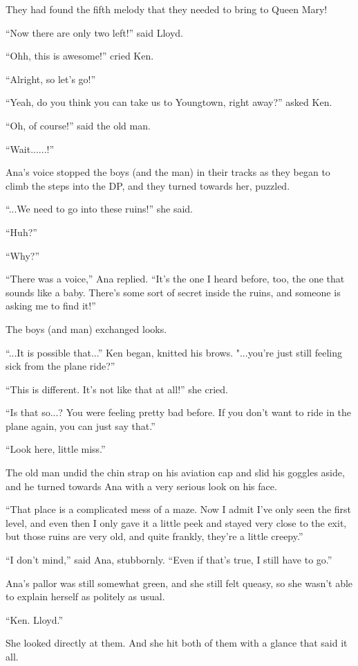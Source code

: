 \documentclass[
]{article}
\begin{document}
They had found the fifth melody that they needed to bring to Queen Mary!

``Now there are only two left!'' said Lloyd.

``Ohh, this is awesome!'' cried Ken.

``Alright, so let's go!''

``Yeah, do you think you can take us to Youngtown, right away?'' asked
Ken.

``Oh, of course!'' said the old man.

``Wait......!''

Ana's voice stopped the boys (and the man) in their tracks as they began
to climb the steps into the DP, and they turned towards her, puzzled.

``...We need to go into these ruins!'' she said.

``Huh?''

``Why?''

``There was a voice,'' Ana replied. ``It's the one I heard before, too,
the one that sounds like a baby. There's some sort of secret inside the
ruins, and someone is asking me to find it!''

The boys (and man) exchanged looks.

``...It is possible that...'' Ken began, knitted his brows. "...you're
just still feeling sick from the plane ride?''

``This is different. It's not like that at all!'' she cried.

``Is that so...? You were feeling pretty bad before. If you don't want
to ride in the plane again, you can just say that.''

``Look here, little miss.''

The old man undid the chin strap on his aviation cap and slid his
goggles aside, and he turned towards Ana with a very serious look on his
face.

``That place is a complicated mess of a maze. Now I admit I've only seen
the first level, and even then I only gave it a little peek and stayed
very close to the exit, but those ruins are very old, and quite frankly,
they're a little creepy.''

``I don't mind,'' said Ana, stubbornly. ``Even if that's true, I still
have to go.''

Ana's pallor was still somewhat green, and she still felt queasy, so she
wasn't able to explain herself as politely as usual.

``Ken. Lloyd.''

She looked directly at them. And she hit both of them with a glance that
said it all.
\end{document}
